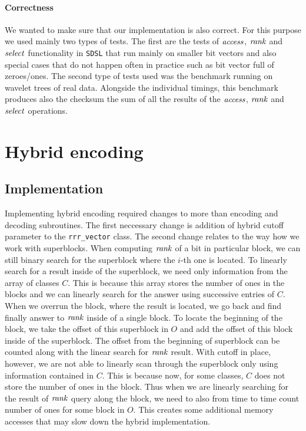 \paragraph{Correctness}

We wanted to make sure that our implementation is also correct. For this purpose we used mainly
two types of tests. The first are the tests of $\mathit{access}$, $\mathit{rank}$ and $\mathit{select}$ functionality in
\texttt{SDSL} that run mainly on smaller bit vectors and also special cases that do not happen
often in practice such as bit vector full of zeroes/ones. The second type of tests used was the
benchmark running on wavelet trees of real data. Alongside the individual timings, this benchmark
produces also the checksum the sum of all the results of the $\mathit{access}$, $\mathit{rank}$ and $\mathit{select}$
operations.

\section{Hybrid encoding}

\subsection{Implementation}

Implementing hybrid encoding required changes to more than encoding and decoding
subroutines. The first neccessary change is addition of hybrid cutoff parameter
to the \texttt{rrr\_vector} class. The second change relates to the way how we work
with superblocks. When computing $\mathit{rank}$ of a bit in particular block, we can still binary
search for the superblock where the $i$-th one is located. To linearly search for a result
inside of the superblock, we need only information from the array of classes $C$.
This is because this array stores the number of ones in the blocks and we can linearly
search for the answer using successive entries of $C$. When we overrun the block, where
the result is located, we go back and find finally answer to $\mathit{rank}$ inside of a
single block. To locate the beginning of the block, we take the offset of this superblock
in $O$ and add the offset of this block inside of the superblock. The offset from the
beginning of superblock can be counted along with the linear search for $\mathit{rank}$ result.
With cutoff in place, however, we are not able to linearly scan through the superblock
only using information contained in $C$. This is because now, for some classes, $C$ does
not store the number of ones in the block. Thus when we are linearly searching for the result
of $\mathit{rank}$ query along the block, we need to also from time to time count number of ones
for some block in $O$. This creates some additional memory accesses that may slow down the
hybrid implementation.

